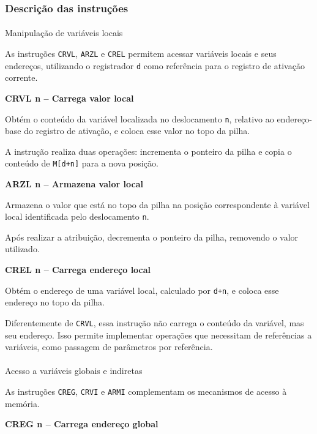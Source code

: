\documentclass[
  brazilian,
  letterpaper,
]{book}
\makeatletter
\let\oldparagraph\paragraph
\renewcommand{\paragraph}{
    \@ifstar
      \xxxParagraphStar
      \xxxParagraphNoStar
  }
\newcommand{\xxxParagraphStar}[1]{\oldparagraph*{#1}\mbox{}}
\newcommand{\xxxParagraphNoStar}[1]{\oldparagraph{#1}\mbox{}}
\theoremstyle{plain}
\theoremstyle{definition}
\theoremstyle{remark}
\makeatother
\begin{document}
\subsubsection{Descrição das
instruções}\label{descriuxe7uxe3o-das-instruuxe7uxf5es}

\paragraph{Manipulação de variáveis
locais}\label{manipulauxe7uxe3o-de-variuxe1veis-locais}

As instruções \texttt{CRVL}, \texttt{ARZL} e \texttt{CREL} permitem
acessar variáveis locais e seus endereços, utilizando o registrador
\texttt{d} como referência para o registro de ativação corrente.

\textbf{CRVL n -- Carrega valor local}

Obtém o conteúdo da variável localizada no deslocamento \texttt{n},
relativo ao endereço-base do registro de ativação, e coloca esse valor
no topo da pilha.

A instrução realiza duas operações: incrementa o ponteiro da pilha e
copia o conteúdo de \texttt{M{[}d+n{]}} para a nova posição.

\textbf{ARZL n -- Armazena valor local}

Armazena o valor que está no topo da pilha na posição correspondente à
variável local identificada pelo deslocamento \texttt{n}.

Após realizar a atribuição, decrementa o ponteiro da pilha, removendo o
valor utilizado.

\textbf{CREL n -- Carrega endereço local}

Obtém o endereço de uma variável local, calculado por \texttt{d+n}, e
coloca esse endereço no topo da pilha.

Diferentemente de \texttt{CRVL}, essa instrução não carrega o conteúdo
da variável, mas seu endereço. Isso permite implementar operações que
necessitam de referências a variáveis, como passagem de parâmetros por
referência.

\paragraph{Acesso a variáveis globais e
indiretas}\label{acesso-a-variuxe1veis-globais-e-indiretas}

As instruções \texttt{CREG}, \texttt{CRVI} e \texttt{ARMI} complementam
os mecanismos de acesso à memória.

\textbf{CREG n -- Carrega endereço global}
\end{document}
